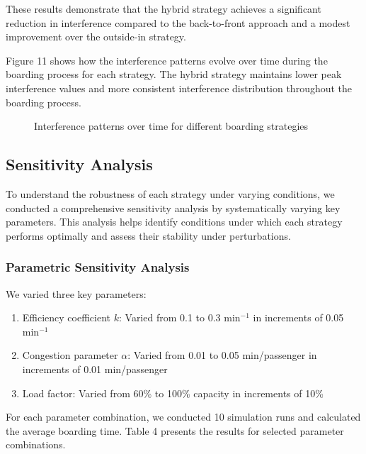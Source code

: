 These results demonstrate that the hybrid strategy achieves a significant reduction in interference compared to the back-to-front approach and a modest improvement over the outside-in strategy.

Figure 11 shows how the interference patterns evolve over time during the boarding process for each strategy. The hybrid strategy maintains lower peak interference values and more consistent interference distribution throughout the boarding process.

\begin{figure}[h]
\centering
\caption{Interference patterns over time for different boarding strategies}
\label{fig:interference_over_time}
\end{figure}

\subsection{Sensitivity Analysis}

To understand the robustness of each strategy under varying conditions, we conducted a comprehensive sensitivity analysis by systematically varying key parameters. This analysis helps identify conditions under which each strategy performs optimally and assess their stability under perturbations.

\subsubsection{Parametric Sensitivity Analysis}

We varied three key parameters:

\begin{enumerate}
    \item Efficiency coefficient $k$: Varied from 0.1 to 0.3 min$^{-1}$ in increments of 0.05 min$^{-1}$
    \item Congestion parameter $\alpha$: Varied from 0.01 to 0.05 min/passenger in increments of 0.01 min/passenger
    \item Load factor: Varied from 60\% to 100\% capacity in increments of 10\%
\end{enumerate}

For each parameter combination, we conducted 10 simulation runs and calculated the average boarding time. Table 4 presents the results for selected parameter combinations.

